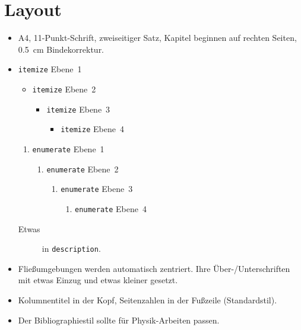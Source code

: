\section{Layout}
\begin{itemize}
  \item A4, 11-Punkt-Schrift, zweiseitiger Satz, Kapitel beginnen auf rechten Seiten, \SI{0.5}{\centi\meter} Bindekorrektur.

  \item \texttt{itemize} Ebene~1
    \begin{itemize}
      \item \texttt{itemize} Ebene~2
        \begin{itemize}
          \item \texttt{itemize} Ebene~3
            \begin{itemize}
              \item \texttt{itemize} Ebene~4
            \end{itemize}
        \end{itemize}
    \end{itemize}
    \begin{enumerate}
      \item \texttt{enumerate} Ebene~1
        \begin{enumerate}
          \item \texttt{enumerate} Ebene~2
            \begin{enumerate}
              \item \texttt{enumerate} Ebene~3
                \begin{enumerate}
                  \item \texttt{enumerate} Ebene~4
                \end{enumerate}
            \end{enumerate}
        \end{enumerate}
    \end{enumerate}
    \begin{description}
      \item[Etwas] in \texttt{description}.
    \end{description}

  \item Fließumgebungen werden automatisch zentriert.
    Ihre Über-/Unterschriften mit etwas Einzug und etwas kleiner gesetzt.

  \item Kolumnentitel in der Kopf, Seitenzahlen in der Fußzeile (Standardstil).

  \item Der Bibliographiestil sollte für Physik-Arbeiten passen.
\end{itemize}

